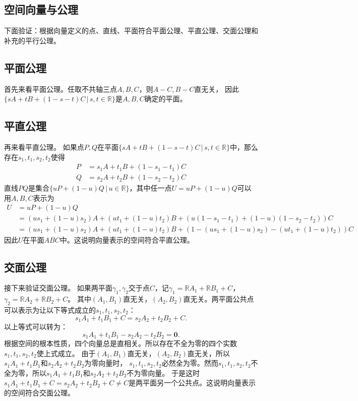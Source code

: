 \documentclass[12pt,UTF8]{ctexbook}
\begin{document}
\begin{appendix}
\chapter{空间向量与公理}

下面验证：根据向量定义的点、直线、平面符合平面公理、平直公理、交面公理和补充的平行公理。

\section{平面公理}
首先来看平面公理。任取不共轴三点$A,B,C$，则$A-C,B-C$直无关，
因此$ \{sA+tB+(1 - s - t)C \, | \,s, t\in\mathbb{R}\}$是$A,B,C$确定的平面。

\section{平直公理}
再来看平直公理。
如果点$P,Q$在平面$ \{sA+tB+(1 - s - t)C \, | \, s,t\in\mathbb{R}\}$中，那么存在$s_1, t_1, s_2, t_2$使得
\begin{align*}
P &= s_1A + t_1B + (1 - s_1 - t_1)C  \\
Q &= s_2A + t_2B + (1 - s_2 - t_2)C  
\end{align*}
直线$PQ$是集合$\{uP+(1-u)Q \, | \, u\in \mathbb{R}\}$，其中任一点$U = uP+(1-u)Q$可以用$A,B,C$表示为
\begin{align*}
U &= uP+(1-u)Q  \\
&= (us_1 + (1-u)s_2)A + (ut_1 + (1-u)t_2)B + (u(1 - s_1 - t_1) + (1-u)(1 - s_2 - t_2))C   \\
&= (us_1 + (1-u)s_2)A + (ut_1 + (1-u)t_2)B + (1 - (us_1 + (1-u)s_2) - (ut_1 + (1-u)t_2))C 
\end{align*}
因此$U$在平面$ABC$中。这说明向量表示的空间符合平直公理。

\section{交面公理}
接下来验证交面公理。
如果两平面$\gamma_1, \gamma_2$交于点$C$，记$\gamma_1 = \mathbb{R}A_1+\mathbb{R}B_1+C$，$\gamma_2 = \mathbb{R}A_2+\mathbb{R}B_2+C$。
其中$(A_1,B_1)$直无关，$(A_2,B_2)$直无关。两平面公共点可以表示为让以下等式成立的$s_1,t_1,s_2,t_2$：
$$ s_1A_1+t_1B_1+C = s_2A_2+t_2B_2+C. $$
以上等式可以转为：
$$ s_1A_1+t_1B_1 - s_2A_2 - t_2B_2 = \mathbf{0}. $$
根据空间的根本性质，四个向量总是直相关。所以存在不全为零的四个实数$s_1,t_1,s_2,t_2$使上式成立。
由于$(A_1,B_1)$直无关，$(A_2,B_2)$直无关，所以$s_1A_1+t_1B_1$和$s_2A_2 + t_2B_2$为零向量时，
$s_1,t_1,s_2,t_2$必然全为零。然而$s_1,t_1,s_2,t_2$不全为零，所以$s_1A_1+t_1B_1$和$s_2A_2 + t_2B_2$不为零向量。
于是这时$s_1A_1+t_1B_1+C = s_2A_2+t_2B_2+C\neq C$是两平面另一个公共点。这说明向量表示的空间符合交面公理。


\end{appendix}
\end{document}

